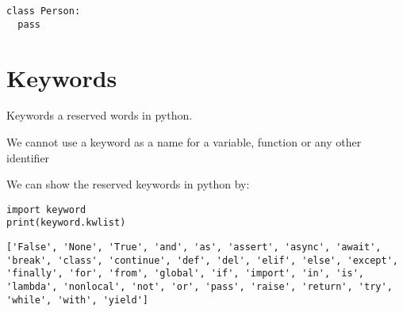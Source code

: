 \documentclass[11pt]{article}
\begin{document}
\begin{verbatim}
class Person:
  pass
\end{verbatim}








\section{Keywords}
\label{sec:org002c962}
Keywords a reserved words in python.

We cannot use a keyword as a name for a variable, function or any other identifier


We can show the reserved keywords in python by:
\begin{verbatim}
import keyword
print(keyword.kwlist)
\end{verbatim}

\begin{verbatim}
['False', 'None', 'True', 'and', 'as', 'assert', 'async', 'await', 'break', 'class', 'continue', 'def', 'del', 'elif', 'else', 'except', 'finally', 'for', 'from', 'global', 'if', 'import', 'in', 'is', 'lambda', 'nonlocal', 'not', 'or', 'pass', 'raise', 'return', 'try', 'while', 'with', 'yield']
\end{verbatim}
\end{document}
